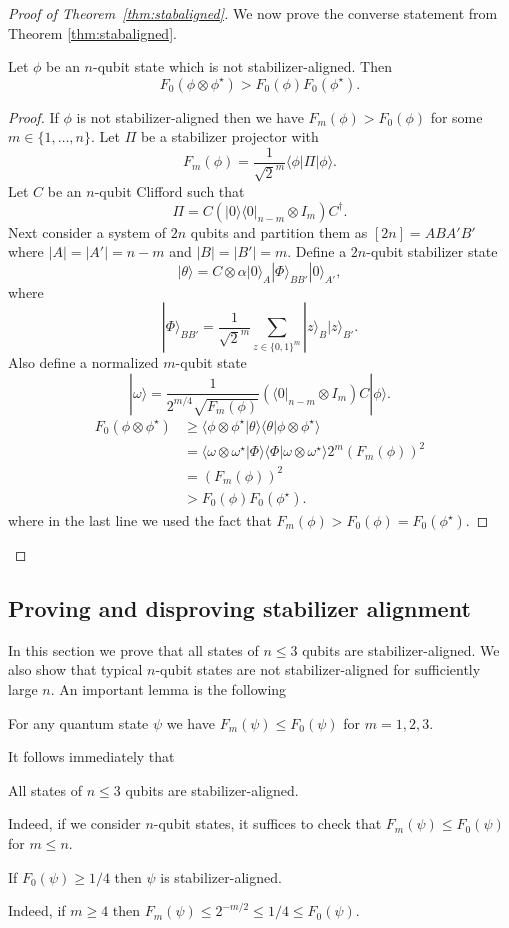 \begin{proof}[Proof of Theorem~\ref{thm:stabaligned}]
We now prove the converse statement from Theorem \ref{thm:stabaligned}.
\begin{lemma}
	Let $\phi$ be an $n$-qubit state which is not stabilizer-aligned. Then
	\[
	F_0(\phi\otimes \phi^{\star})>F_0(\phi)F_0(\phi^{\star}).
	\]
\end{lemma}
\begin{proof}
	If $\phi$ is not stabilizer-aligned then we have $F_m(\phi)>F_0(\phi)$ for some $m\in \{1,\ldots,n\}$. Let $\Pi$ be a stabilizer projector with
	\[
	F_m(\phi)=\frac{1}{\sqrt{2}^m} \langle \phi|\Pi|\phi\rangle.
	\]
	Let $C$ be an $n$-qubit Clifford such that 
	\[
	\Pi=C\left( |0\rangle\langle0|_{n-m}\otimes I_m\right)C^{\dagger}.
	\]
	Next consider a system of $2n$ qubits and partition them as $[2n]=ABA'B'$ where $|A|=|A'|=n-m$ and $|B|=|B'|=m$. Define a $2n$-qubit stabilizer state
	\[
	|\theta\rangle=C\otimes \alpha |0\rangle_A |\Phi\rangle_{BB'} |0\rangle_{A'} ,
	\] 
	where 
	\[
	|\Phi\rangle_{BB'}=\frac{1}{\sqrt{2}^m}\sum_{z\in \{0,1\}^m}|z\rangle_B|z\rangle_{B'}.
	\]
	Also define a normalized $m$-qubit state
	\[
	|\omega\rangle=\frac{1}{2^{m/4}\sqrt{F_m(\phi)}}\left(\langle 0|_{n-m}\otimes I_m\right) C|\phi\rangle.
	\]
	\begin{align}
		F_0(\phi\otimes \phi^{\star})&\geq \langle \phi\otimes \phi^{\star} |\theta\rangle\langle \theta| \phi\otimes \phi^{\star}\rangle\\
		&=\langle \omega\otimes \omega^\star|\Phi\rangle \langle \Phi|\omega\otimes \omega^\star\rangle 2^m (F_m(\phi))^2\\
		&=(F_m(\phi))^2\\
		&> F_0(\phi) F_0(\phi^{\star}).
	\end{align}
	where in the last line we used the fact that $F_m(\phi)>F_0(\phi)=F_0(\phi^{\star})$.
\end{proof}
\end{proof}

\subsection{Proving and disproving stabilizer alignment}
\label{Sec_when_stab_aligned}

In this section we prove that all states of $n\le 3$ qubits
are stabilizer-aligned.  We also show that 
typical  $n$-qubit states are not stabilizer-aligned for sufficiently large $n$.
An important lemma is the following
\begin{lemma}
	\label{Lem_F_ordering}
For any quantum state $\psi$ we have
$F_m(\psi)\le F_0(\psi)$ for $m=1,2,3$.	 
\end{lemma}
\noindent
It follows immediately that 
\begin{corol}
	\label{Cor_single_qubits}
All states of $n\le 3$ qubits are stabilizer-aligned.  
\end{corol}
Indeed, if we consider $n$-qubit states, it suffices to check
that $F_m(\psi)\le F_0(\psi)$ for $m\le n$.
\begin{corol}
\label{Cor_Fid_Stab_align}	
	If  $F_0(\psi) \geq 1/4$ then $\psi$ is stabilizer-aligned.  
\end{corol}
Indeed, if $m\ge 4$ then  $F_m(\psi) \le 2^{-m/2}\le 1/4\le F_0(\psi)$.

